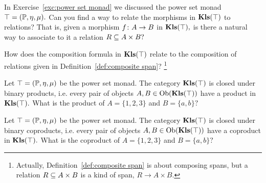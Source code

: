\documentclass[CT4S-EN-RU]{subfiles}
\begin{document}
\begin{exampleRUS}\label{ex:experimenter matters 3}
\end{exampleRUS}

\begin{exerciseENG}\label{exc:kleisli powerset relations}
In Exercise~\ref{exc:power set monad} we discussed the power set monad $\top=(\PP,\eta,\mu).$
\sexc Can you find a way to relate the morphisms in $\Kls(\top)$ to relations? That is, given a morphism $f\taking A\to B$ in $\Kls(\top),$ is there a natural way to associate to it a relation $R\ss A\times B?$
\item How does the composition formula in $\Kls(\top)$ relate to the composition of relations given in Definition~\ref{def:composite span}?
\footnote{Actually, Definition~\ref{def:composite span} is about composing spans, but a relation $R\ss A\times B$ is a kind of span, $R\to A\times B.$}
\endsexc
\end{exerciseENG}

\begin{exerciseRUS}\label{exc:kleisli powerset relations}
\end{exerciseRUS}

\begin{exerciseENG}
Let $\top=(\PP,\eta,\mu)$ be the power set monad. The category $\Kls(\top)$ is closed under binary products, i.e. every pair of objects $A,B\in\Ob(\Kls(\top))$ have a product in $\Kls(\top).$ What is the product of $A=\{1,2,3\}$ and $B=\{a,b\}?$
\end{exerciseENG}

\begin{exerciseRUS}
\end{exerciseRUS}

\begin{exerciseENG}
Let $\top=(\PP,\eta,\mu)$ be the power set monad. The category $\Kls(\top)$ is closed under binary coproducts, i.e. every pair of objects $A,B\in\Ob(\Kls(\top))$ have a coproduct in $\Kls(\top).$ What is the coproduct of $A=\{1,2,3\}$ and $B=\{a,b\}?$
\end{exerciseENG}

\begin{exerciseRUS}
\end{exerciseRUS}
\end{document}
